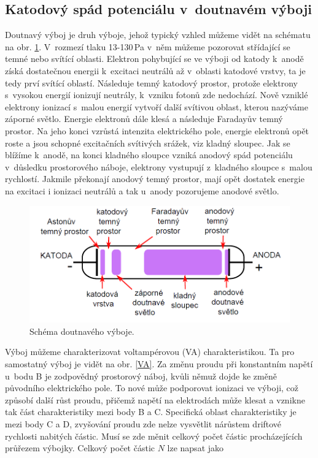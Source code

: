 \documentclass[a4paper,12pt]{article}
\begin{document}
\subsection{Katodový spád potenciálu v~doutnavém výboji}
Doutnavý výboj je druh výboje, jehož typický vzhled můžeme vidět na schématu na obr. \ref{glowdischarge}. V~rozmezí tlaku 13-130\,\si{\pascal} v~něm můžeme pozorovat střídající se temné nebo svítící oblasti. Elektron pohybující se ve výboji od katody k~anodě získá dostatečnou energii k~excitaci neutrálů až v~oblasti katodové vrstvy, ta je tedy prví svítící oblastí. Následuje temný katodový prostor, protože elektrony s~vysokou energií ionizují neutrály, k~vzniku fotonů zde nedochází. Nově vzniklé elektrony ionizací s~malou energií vytvoří další svítivou oblast, kterou nazýváme záporné světlo. Energie elektronů dále klesá a následuje Faradayův temný prostor. Na jeho konci vzrůstá intenzita elektrického pole, energie elektronů opět roste a jsou schopné excitačních svítivých srážek, viz kladný sloupec. Jak se blížíme k~anodě, na konci kladného sloupce vzniká anodový spád potenciálu v~důsledku prostorového náboje, elektrony vystupují z~kladného sloupce s~malou rychlostí. Jakmile překonají anodový temný prostor, mají opět dostatek energie na excitaci i ionizaci neutrálů a tak u~anody pozorujeme anodové světlo.

\begin{figure}[h]
	\centering
	\includegraphics[width=130mm]{glowdischarge.png}
	\caption{Schéma doutnavého výboje.}
	\label{glowdischarge}
\end{figure}

Výboj můžeme charakterizovat voltampérovou (VA) charakteristikou. Ta pro samostatný výboj je vidět na obr. \ref{VA}. Za změnu proudu při konstantním napětí u~bodu B je zodpovědný prostorový náboj, kvůli němuž dojde ke změně původního elektrického pole. To nové může podporovat ionizaci ve výboji, což způsobí další růst proudu, přičemž napětí na elektrodách může klesat a vznikne tak část charakteristiky mezi body B a C. Specifická oblast charakteristiky je mezi body C a D, zvyšování proudu zde nelze vysvětlit nárůstem driftové rychlosti nabitých částic. Musí se zde měnit celkový počet částic procházejících průřezem výbojky. Celkový počet částic $N$ lze napsat jako
\end{document}
